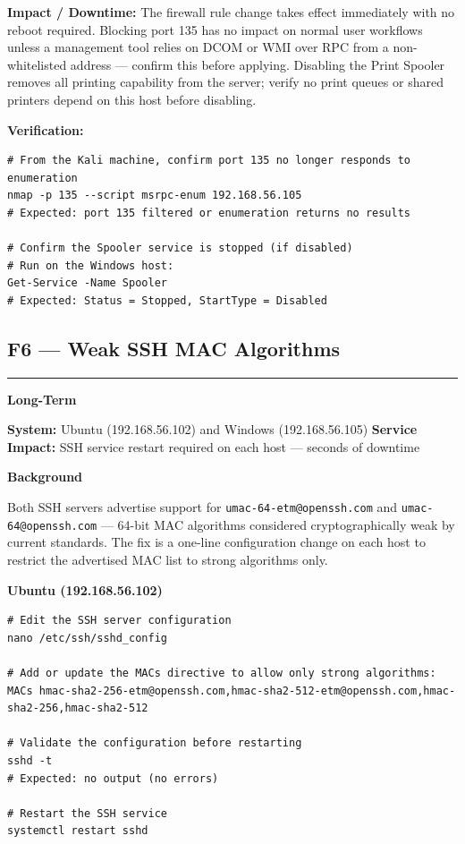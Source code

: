 \documentclass[12pt]{article}
\newcommand{\tfbadge}[2]{%
  \colorbox{#1}{\color{white}\textbf{\small #2}}%
}
\newcommand{\sectionrule}{%
  \vspace{4pt}\noindent\textcolor{headercol}{\rule{\linewidth}{0.8pt}}\vspace{4pt}%
}
\begin{document}
\begin{impactbox}
\textbf{Impact / Downtime:} The firewall rule change takes effect immediately
with no reboot required. Blocking port 135 has no impact on normal user
workflows unless a management tool relies on DCOM or WMI over RPC from a
non-whitelisted address --- confirm this before applying. Disabling the Print
Spooler removes all printing capability from the server; verify no print
queues or shared printers depend on this host before disabling.
\end{impactbox}
 
\bigskip
 
\begin{verifybox}
\textbf{Verification:}
\begin{lstlisting}[style=terminal]
# From the Kali machine, confirm port 135 no longer responds to enumeration
nmap -p 135 --script msrpc-enum 192.168.56.105
# Expected: port 135 filtered or enumeration returns no results
 
# Confirm the Spooler service is stopped (if disabled)
# Run on the Windows host:
Get-Service -Name Spooler
# Expected: Status = Stopped, StartType = Disabled
\end{lstlisting}
\end{verifybox}
\newpage
\subsection{F6 --- Weak SSH MAC Algorithms}
\sectionrule
 
\noindent\tfbadge{longcol}{Long-Term}
\quad\textbf{System:} Ubuntu (192.168.56.102) and Windows (192.168.56.105)
\quad\textbf{Service Impact:} SSH service restart required on each host ---
seconds of downtime
 
\bigskip
\noindent\textbf{Background}
 
Both SSH servers advertise support for \texttt{umac-64-etm@openssh.com} and
\texttt{umac-64@openssh.com} --- 64-bit MAC algorithms considered
cryptographically weak by current standards. The fix is a one-line
configuration change on each host to restrict the advertised MAC list to
strong algorithms only.
 
\bigskip
\noindent\textbf{Ubuntu (192.168.56.102)}
 
\begin{lstlisting}[style=terminal]
# Edit the SSH server configuration
nano /etc/ssh/sshd_config
 
# Add or update the MACs directive to allow only strong algorithms:
MACs hmac-sha2-256-etm@openssh.com,hmac-sha2-512-etm@openssh.com,hmac-sha2-256,hmac-sha2-512
 
# Validate the configuration before restarting
sshd -t
# Expected: no output (no errors)
 
# Restart the SSH service
systemctl restart sshd
\end{lstlisting}
 
\end{document}
